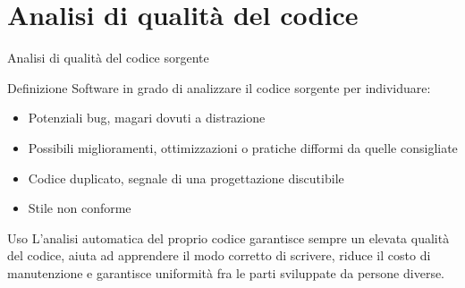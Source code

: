 \documentclass[presentation]{beamer}
\begin{document}
\section{Analisi di qualità  del codice}

\begin{frame}{Analisi di qualità  del codice sorgente}
	\begin{block}{Definizione}
		Software in grado di analizzare il codice sorgente per individuare:
		\begin{itemize}
			\item Potenziali bug, magari dovuti a distrazione
			\item Possibili miglioramenti, ottimizzazioni o pratiche difformi da quelle consigliate
			\item Codice duplicato, segnale di una progettazione discutibile
			\item Stile non conforme
		\end{itemize}
	\end{block}
	\begin{block}{Uso}
		L'analisi automatica del proprio codice garantisce sempre un elevata qualità  del codice, aiuta ad apprendere il modo corretto di scrivere, riduce il costo di manutenzione e garantisce uniformità  fra le parti sviluppate da persone diverse.
	\end{block}
\end{frame}
\end{document}
